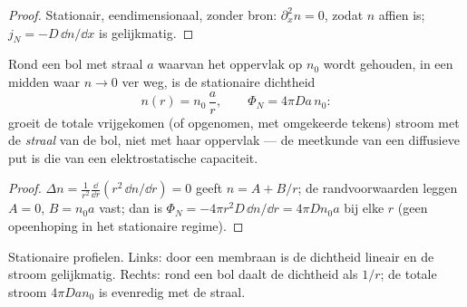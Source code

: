 \begin{proof}
Stationair, eendimensionaal, zonder bron: $\partial_x^2 n = 0$, zodat $n$
affien is; $j_N = -D\,\dd n/\dd x$ is gelijkmatig.
\end{proof}

\begin{proposition}\label{prop:b2:particle-diffusion:sphere}
Rond een bol met straal $a$ waarvan het oppervlak op $n_0$ wordt gehouden, in een
midden waar $n \to 0$ ver weg, is de stationaire dichtheid
\[
n(r) = n_0\,\frac{a}{r}, \qquad
\Phi_N = 4\pi D a\,n_0 :
\]
groeit de totale vrijgekomen (of opgenomen, met omgekeerde tekens) stroom
met de \emph{straal} van de bol, niet met haar oppervlak --- de
meetkunde van een diffusieve put is die van een elektrostatische capaciteit.
\end{proposition}

\begin{proof}
$\Delta n = \frac{1}{r^2}\frac{\dd}{\dd r}(r^2\,\dd n/\dd r) = 0$ geeft
$n = A + B/r$; de randvoorwaarden leggen $A = 0$, $B = n_0 a$ vast; dan is
$\Phi_N = -4\pi r^2 D\,\dd n/\dd r = 4\pi D n_0 a$ bij elke $r$ (geen
opeenhoping in het stationaire regime).
\end{proof}

\begin{omfigure}

{\small Stationaire profielen. Links: door een membraan is de dichtheid
lineair en de stroom gelijkmatig. Rechts: rond een bol daalt de dichtheid
als $1/r$; de totale stroom $4\pi D a n_0$ is evenredig met de
straal.}
\end{omfigure}

